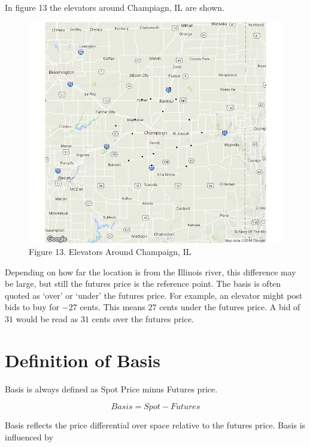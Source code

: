 \documentclass[
  letterpaper,
  DIV=11,
  numbers=noendperiod]{scrreprt}
\begin{document}
In figure 13 the elevators around Champiagn, IL are shown.

\begin{figure}

{\centering \includegraphics{images/Champaign-Elevators.png}

}

\caption{Figure 13. Elevators Around Champaign, IL}

\end{figure}

Depending on how far the location is from the Illinois river, this
difference may be large, but still the futures price is the reference
point. The basis is often quoted as `over' or `under' the futures price.
For example, an elevator might post bids to buy for \(-27\) cents. This
means \(27\) cents under the futures price. A bid of \(31\) would be
read as \(31\) cents over the futures price.

\hypertarget{definition-of-basis}{%
\section{Definition of Basis}\label{definition-of-basis}}

Basis is always defined as Spot Price minus Futures price.

\[Basis = Spot - Futures\]

Basis reflects the price differential over space relative to the futures
price. Basis is influenced by
\end{document}
